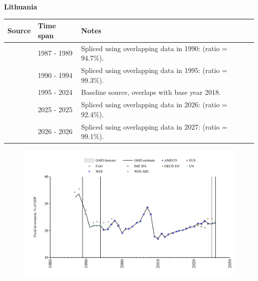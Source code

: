 \documentclass[12pt,a4paper,landscape]{article}
\begin{document}
\begin{adjustbox}{max totalsize={\paperwidth}{\paperheight},center}
\begin{minipage}[t][\textheight][t]{\textwidth}
\vspace*{0.5cm}
{}
\begin{center}
{\Large\bfseries Lithuania}
\end{center}
\vspace{0.5cm}
\begin{table}[H]
\centering
\small
\begin{tabular}{|l|l|l|}
\hline
\textbf{Source} & \textbf{Time span} & \textbf{Notes} \\
\hline
\rowcolor{white}\cite{WDI_ARC}& 1987 - 1989 &Spliced using overlapping data in 1990: (ratio = 94.7\%).\\
\rowcolor{lightgray}\cite{UN}& 1990 - 1994 &Spliced using overlapping data in 1995: (ratio = 99.3\%).\\
\rowcolor{white}\cite{EUS}& 1995 - 2024 &Baseline source, overlaps with base year 2018.\\
\rowcolor{lightgray}\cite{OECD_EO}& 2025 - 2025 &Spliced using overlapping data in 2026: (ratio = 92.4\%).\\
\rowcolor{white}\cite{AMECO}& 2026 - 2026 &Spliced using overlapping data in 2027: (ratio = 99.1\%).\\
\hline
\end{tabular}
\end{table}
\begin{figure}[H]
\centering
\includegraphics[width=\textwidth,height=0.6\textheight,keepaspectratio]{graphs/LTU_finv_GDP.pdf}
\end{figure}
\end{minipage}
\end{adjustbox}
\end{document}
